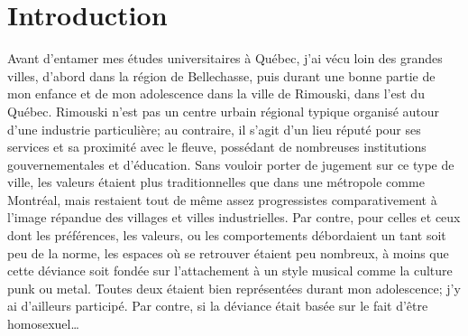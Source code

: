 \chapter*{Introduction}         %

Avant d'entamer mes études universitaires à Québec, j'ai vécu loin des grandes villes, d'abord dans la région de Bellechasse, puis durant une bonne partie de mon enfance et de mon adolescence dans la ville de Rimouski, dans l'est du Québec.
Rimouski n'est pas un centre urbain régional typique organisé autour d'une industrie particulière; au contraire, il s'agit d'un lieu réputé pour ses services et sa proximité avec le fleuve, possédant de nombreuses institutions gouvernementales et d'éducation.
Sans vouloir porter de jugement sur ce type de ville, les valeurs étaient plus traditionnelles que dans une métropole comme Montréal, mais restaient tout de même assez progressistes comparativement à l'image répandue des villages et villes industrielles.
Par contre, pour celles et ceux dont les préférences, les valeurs, ou les comportements débordaient un tant soit peu de la norme, les espaces où se retrouver étaient peu nombreux, à moins que cette déviance soit fondée sur l'attachement à un style musical comme la culture punk ou metal.
Toutes deux étaient bien représentées durant mon adolescence; j'y ai d'ailleurs participé.
Par contre, si la déviance était basée sur le fait d'être homosexuel\ldots{}

